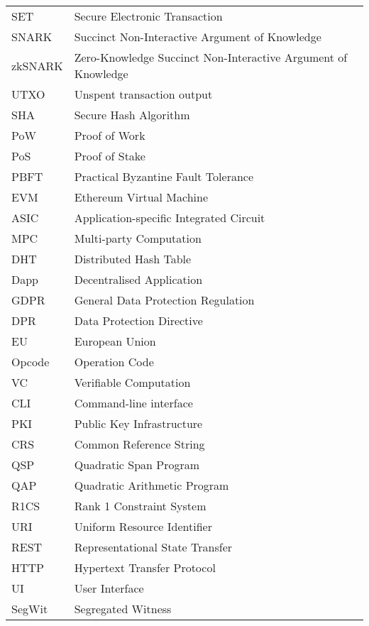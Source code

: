 
\abbreviations
\begin{center}
	\renewcommand{\arraystretch}{1.5}
	\begin{longtable}{ l @{\qquad} l }
	\toprule
	SET    & Secure Electronic Transaction \\
	SNARK & Succinct Non-Interactive Argument of Knowledge \\
	zkSNARK    & Zero-Knowledge Succinct Non-Interactive Argument of Knowledge \\
	UTXO    & Unspent transaction output \\
	SHA    & Secure Hash Algorithm \\
	PoW    & Proof of Work \\
	PoS    & Proof of Stake \\
	PBFT    & Practical Byzantine Fault Tolerance \\
	EVM    & Ethereum Virtual Machine \\
	ASIC    & Application-specific Integrated Circuit \\
	MPC    & Multi-party Computation \\
	DHT    & Distributed Hash Table \\
	Dapp    & Decentralised Application \\
	GDPR    & General Data Protection Regulation \\
	DPR    & Data Protection Directive \\
	EU    & European Union \\
	Opcode    & Operation Code \\
	VC    & Verifiable Computation \\
	CLI    & Command-line interface \\
	PKI    & Public Key Infrastructure \\
	CRS    & Common Reference String \\
	QSP    & Quadratic Span Program \\
	QAP    & Quadratic Arithmetic Program \\
	R1CS    & Rank 1 Constraint System \\
	URI    & Uniform Resource Identifier \\
	REST    & Representational State Transfer \\
	HTTP    & Hypertext Transfer Protocol \\
	UI    & User Interface \\
	SegWit    & Segregated Witness \\
	\bottomrule
	\end{longtable}
\end{center}
